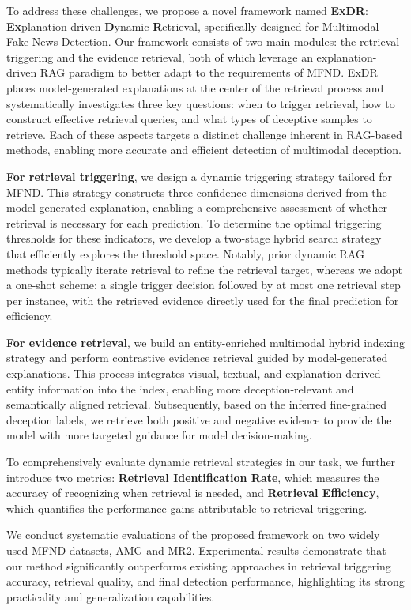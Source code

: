 To address these challenges, we propose a novel framework named \textbf{ExDR}: \textbf{Ex}planation-driven \textbf{D}ynamic \textbf{R}etrieval, specifically designed for Multimodal Fake News Detection.
Our framework consists of two main modules: the retrieval triggering and the evidence retrieval, both of which leverage an explanation-driven RAG paradigm to better adapt to the requirements of MFND. ExDR places model-generated explanations at the center of the retrieval process and systematically investigates three key questions: when to trigger retrieval, how to construct effective retrieval queries, and what types of deceptive samples to retrieve. Each of these aspects targets a distinct challenge inherent in RAG-based methods, enabling more accurate and efficient detection of multimodal deception.


\textbf{For retrieval triggering}, we design a dynamic triggering strategy tailored for MFND. This strategy constructs three confidence dimensions derived from the model-generated explanation, enabling a comprehensive assessment of whether retrieval is necessary for each prediction.  To determine the optimal triggering thresholds for these indicators, we develop a two-stage hybrid search strategy that efficiently explores the threshold space. Notably, prior dynamic RAG methods typically iterate retrieval to refine the retrieval target, whereas we adopt a one-shot scheme: a single trigger decision followed by at most one retrieval step per instance, with the retrieved evidence directly used for the final prediction for efficiency.


\textbf{For evidence retrieval}, we build an entity-enriched multimodal hybrid indexing strategy and perform contrastive evidence retrieval guided by model-generated
explanations. This process integrates visual, textual, and explanation-derived entity information into the index, enabling more deception-relevant and semantically aligned retrieval. Subsequently, based on the inferred fine-grained deception labels, we retrieve both positive and negative evidence to provide the model with more targeted guidance for model decision-making.

To comprehensively evaluate dynamic retrieval strategies in our task, we further introduce two metrics: \textbf{Retrieval Identification Rate}, which measures the accuracy of recognizing when retrieval is needed, and \textbf{Retrieval Efficiency}, which quantifies the performance gains attributable to retrieval triggering.


We conduct systematic evaluations of the proposed framework on two widely used MFND datasets, AMG and MR2. Experimental results demonstrate that our method significantly outperforms existing approaches in retrieval triggering accuracy, retrieval quality, and final detection performance, highlighting its strong practicality and generalization capabilities. 

